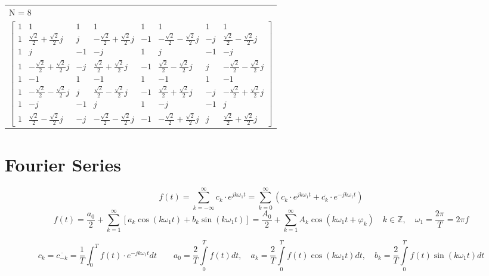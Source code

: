 		\begin{tabular}{l }
        N = 8\\
 		$\begin{bmatrix}
		1 & 1 & 1 & 1 & 1 & 1 & 1 & 1\\
		1 & \frac{\sqrt{2}}{2}+\frac{\sqrt{2}}{2}j & j &
		-\frac{\sqrt{2}}{2}+\frac{\sqrt{2}}{2}j & -1 &
		-\frac{\sqrt{2}}{2}-\frac{\sqrt{2}}{2}j & -j &
		\frac{\sqrt{2}}{2}-\frac{\sqrt{2}}{2}j\\
		1 & j & -1 & -j & 1 & j & -1 & -j\\
		1 &	-\frac{\sqrt{2}}{2}+\frac{\sqrt{2}}{2}j & -j &
		\frac{\sqrt{2}}{2}+\frac{\sqrt{2}}{2}j & -1 &
		\frac{\sqrt{2}}{2}-\frac{\sqrt{2}}{2}j & j &
		-\frac{\sqrt{2}}{2}-\frac{\sqrt{2}}{2}j\\
		1 & -1 & 1 & -1 & 1 & -1 & 1 & -1\\
		1 &	-\frac{\sqrt{2}}{2}-\frac{\sqrt{2}}{2}j & j &
		\frac{\sqrt{2}}{2}-\frac{\sqrt{2}}{2}j & -1 &
		\frac{\sqrt{2}}{2}+\frac{\sqrt{2}}{2}j & -j &
		-\frac{\sqrt{2}}{2}+\frac{\sqrt{2}}{2}j\\
		1 & -j & -1 & j & 1 & -j & -1 & j\\
		1 &	\frac{\sqrt{2}}{2}-\frac{\sqrt{2}}{2}j & -j &
		-\frac{\sqrt{2}}{2}-\frac{\sqrt{2}}{2}j & -1 &
		-\frac{\sqrt{2}}{2}+\frac{\sqrt{2}}{2}j & j &
		\frac{\sqrt{2}}{2}+\frac{\sqrt{2}}{2}j
		\end{bmatrix}$
		\end{tabular}



	\section{Fourier Series}
  	$$\boxed{f(t) = \sum\limits_{k = -\infty}^{\infty} c_k \cdot e^{j k \omega_1
  	t}}= \boxed{\sum\limits_{k = 0}^{\infty} \left(c_k \cdot e^{j k \omega_1
  	t} + \overline{c_k} \cdot e^{-j k \omega_1t}\right)}$$
  	$$\boxed{f(t) = \frac{a_0}{2} + \sum\limits_{k=1}^{\infty} \left[a_k \cos(k
  	\omega_1 t) + b_k \sin(k \omega_1 t)\right]}=\boxed{\frac{A_0}{2} +
  	\sum\limits_{k=1}^{\infty} A_k \cos(k \omega_1 t + \varphi_k)} \quad k\in
  	\mathbb{Z}, \quad \omega_1=\frac{2 \pi}{T}=2 \pi f$$

	$$\boxed{c_k=\overline{c_{-k}}=\frac{1}{T}\int_0^T{f(t)\cdot
	e^{-jk\omega_1
	t}dt}} \qquad \boxed{a_0 = \frac{2}{T}\int\limits_0^{T} f(t)dt, \quad a_k =
	\frac{2}{T}\int\limits_0^{T} f(t)\cos(k \omega_1 t) dt, \quad b_k =
	\frac{2}{T}\int\limits_0^{T} f(t)\sin(k \omega_1 t) dt}$$


